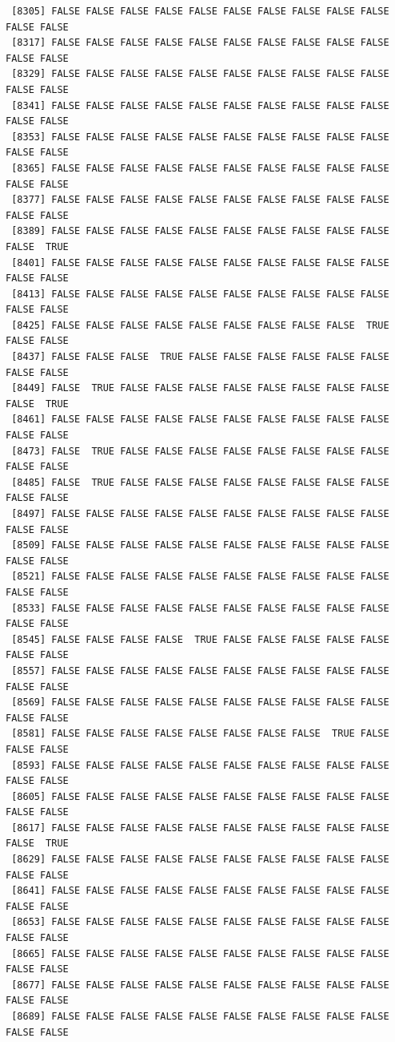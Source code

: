 \documentclass[
  a4paper,
  DIV=11,
  numbers=noendperiod]{scrartcl}
\begin{document}
\begin{verbatim}
 [8305] FALSE FALSE FALSE FALSE FALSE FALSE FALSE FALSE FALSE FALSE FALSE FALSE
 [8317] FALSE FALSE FALSE FALSE FALSE FALSE FALSE FALSE FALSE FALSE FALSE FALSE
 [8329] FALSE FALSE FALSE FALSE FALSE FALSE FALSE FALSE FALSE FALSE FALSE FALSE
 [8341] FALSE FALSE FALSE FALSE FALSE FALSE FALSE FALSE FALSE FALSE FALSE FALSE
 [8353] FALSE FALSE FALSE FALSE FALSE FALSE FALSE FALSE FALSE FALSE FALSE FALSE
 [8365] FALSE FALSE FALSE FALSE FALSE FALSE FALSE FALSE FALSE FALSE FALSE FALSE
 [8377] FALSE FALSE FALSE FALSE FALSE FALSE FALSE FALSE FALSE FALSE FALSE FALSE
 [8389] FALSE FALSE FALSE FALSE FALSE FALSE FALSE FALSE FALSE FALSE FALSE  TRUE
 [8401] FALSE FALSE FALSE FALSE FALSE FALSE FALSE FALSE FALSE FALSE FALSE FALSE
 [8413] FALSE FALSE FALSE FALSE FALSE FALSE FALSE FALSE FALSE FALSE FALSE FALSE
 [8425] FALSE FALSE FALSE FALSE FALSE FALSE FALSE FALSE FALSE  TRUE FALSE FALSE
 [8437] FALSE FALSE FALSE  TRUE FALSE FALSE FALSE FALSE FALSE FALSE FALSE FALSE
 [8449] FALSE  TRUE FALSE FALSE FALSE FALSE FALSE FALSE FALSE FALSE FALSE  TRUE
 [8461] FALSE FALSE FALSE FALSE FALSE FALSE FALSE FALSE FALSE FALSE FALSE FALSE
 [8473] FALSE  TRUE FALSE FALSE FALSE FALSE FALSE FALSE FALSE FALSE FALSE FALSE
 [8485] FALSE  TRUE FALSE FALSE FALSE FALSE FALSE FALSE FALSE FALSE FALSE FALSE
 [8497] FALSE FALSE FALSE FALSE FALSE FALSE FALSE FALSE FALSE FALSE FALSE FALSE
 [8509] FALSE FALSE FALSE FALSE FALSE FALSE FALSE FALSE FALSE FALSE FALSE FALSE
 [8521] FALSE FALSE FALSE FALSE FALSE FALSE FALSE FALSE FALSE FALSE FALSE FALSE
 [8533] FALSE FALSE FALSE FALSE FALSE FALSE FALSE FALSE FALSE FALSE FALSE FALSE
 [8545] FALSE FALSE FALSE FALSE  TRUE FALSE FALSE FALSE FALSE FALSE FALSE FALSE
 [8557] FALSE FALSE FALSE FALSE FALSE FALSE FALSE FALSE FALSE FALSE FALSE FALSE
 [8569] FALSE FALSE FALSE FALSE FALSE FALSE FALSE FALSE FALSE FALSE FALSE FALSE
 [8581] FALSE FALSE FALSE FALSE FALSE FALSE FALSE FALSE  TRUE FALSE FALSE FALSE
 [8593] FALSE FALSE FALSE FALSE FALSE FALSE FALSE FALSE FALSE FALSE FALSE FALSE
 [8605] FALSE FALSE FALSE FALSE FALSE FALSE FALSE FALSE FALSE FALSE FALSE FALSE
 [8617] FALSE FALSE FALSE FALSE FALSE FALSE FALSE FALSE FALSE FALSE FALSE  TRUE
 [8629] FALSE FALSE FALSE FALSE FALSE FALSE FALSE FALSE FALSE FALSE FALSE FALSE
 [8641] FALSE FALSE FALSE FALSE FALSE FALSE FALSE FALSE FALSE FALSE FALSE FALSE
 [8653] FALSE FALSE FALSE FALSE FALSE FALSE FALSE FALSE FALSE FALSE FALSE FALSE
 [8665] FALSE FALSE FALSE FALSE FALSE FALSE FALSE FALSE FALSE FALSE FALSE FALSE
 [8677] FALSE FALSE FALSE FALSE FALSE FALSE FALSE FALSE FALSE FALSE FALSE FALSE
 [8689] FALSE FALSE FALSE FALSE FALSE FALSE FALSE FALSE FALSE FALSE FALSE FALSE

\end{verbatim}
\end{document}
